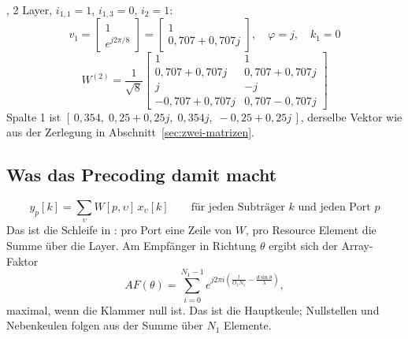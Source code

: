 , 2 Layer, $i_{1,1}=1$, $i_{1,3}=0$, $i_2=1$:
\begin{equation*}
  v_1 = \begin{bmatrix} 1 \\ e^{j2\pi/8} \end{bmatrix} = \begin{bmatrix} 1 \\ 0{,}707+0{,}707j \end{bmatrix},\quad
  \varphi = j,\quad k_1 = 0
\end{equation*}
\begin{equation*}
  W^{(2)} = \frac{1}{\sqrt 8}\begin{bmatrix}
    1 & 1 \\
    0{,}707+0{,}707j & 0{,}707+0{,}707j \\
    j & -j \\
    -0{,}707+0{,}707j & 0{,}707-0{,}707j
  \end{bmatrix}
\end{equation*}
Spalte 1 ist $[\,0{,}354,\; 0{,}25+0{,}25j,\; 0{,}354j,\; -0{,}25+0{,}25j\,]$, derselbe Vektor wie aus der
Zerlegung in Abschnitt~\ref{sec:zwei-matrizen}.

\subsection{Was das Precoding damit macht}
\begin{equation}
  y_p[k] = \sum_{\upsilon} W[p,\upsilon]\, x_\upsilon[k]
  \qquad\text{für jeden Subträger } k \text{ und jeden Port } p
\end{equation}
Das ist die Schleife in : pro Port eine Zeile von $W$, pro Resource Element die
Summe über die Layer. Am Empfänger in Richtung $\theta$ ergibt sich der Array-Faktor
\begin{equation}
  AF(\theta) = \sum_{i=0}^{N_1-1} e^{j2\pi i\left(\frac{l}{O_1 N_1} - \frac{d\sin\theta}{\lambda}\right)},
\end{equation}
maximal, wenn die Klammer null ist. Das ist die Hauptkeule; Nullstellen und Nebenkeulen folgen aus der Summe über
$N_1$ Elemente.
